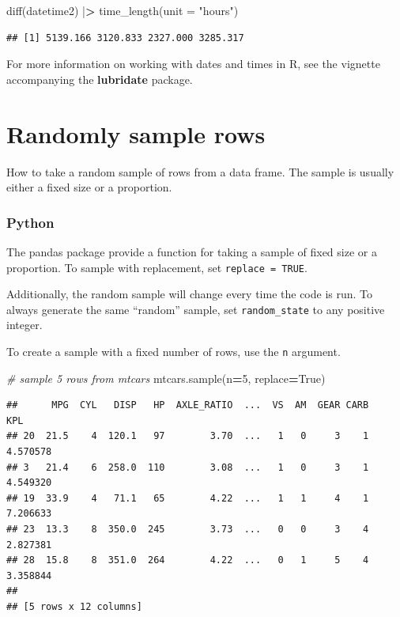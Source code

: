 \documentclass[
]{book}
\newenvironment{Shaded}{\begin{snugshade}}{\end{snugshade}}
\newcommand{\AttributeTok}[1]{\textcolor[rgb]{0.77,0.63,0.00}{#1}}
\newcommand{\CommentTok}[1]{\textcolor[rgb]{0.56,0.35,0.01}{\textit{#1}}}
\newcommand{\DecValTok}[1]{\textcolor[rgb]{0.00,0.00,0.81}{#1}}
\newcommand{\ErrorTok}[1]{\textcolor[rgb]{0.64,0.00,0.00}{\textbf{#1}}}
\newcommand{\FunctionTok}[1]{\textcolor[rgb]{0.00,0.00,0.00}{#1}}
\newcommand{\NormalTok}[1]{#1}
\newcommand{\OperatorTok}[1]{\textcolor[rgb]{0.81,0.36,0.00}{\textbf{#1}}}
\newcommand{\SpecialCharTok}[1]{\textcolor[rgb]{0.00,0.00,0.00}{#1}}
\newcommand{\StringTok}[1]{\textcolor[rgb]{0.31,0.60,0.02}{#1}}
\newcommand{\VariableTok}[1]{\textcolor[rgb]{0.00,0.00,0.00}{#1}}
\begin{document}
\begin{Shaded}
\begin{Highlighting}[]
\FunctionTok{diff}\NormalTok{(datetime2) }\SpecialCharTok{|}\ErrorTok{\textgreater{}} \FunctionTok{time\_length}\NormalTok{(}\AttributeTok{unit =} \StringTok{"hours"}\NormalTok{)}
\end{Highlighting}
\end{Shaded}

\begin{verbatim}
## [1] 5139.166 3120.833 2327.000 3285.317
\end{verbatim}

For more information on working with dates and times in R, see the vignette accompanying the \textbf{lubridate} package.

\hypertarget{randomly-sample-rows}{%
\section{Randomly sample rows}\label{randomly-sample-rows}}

How to take a random sample of rows from a data frame. The sample is usually either a fixed size or a proportion.

\hypertarget{python-29}{%
\subsubsection*{Python}\label{python-29}}

The pandas package provide a function for taking a sample of fixed size or a proportion. To sample with replacement, set \texttt{replace\ =\ TRUE}.

Additionally, the random sample will change every time the code is run. To always generate the same ``random'' sample, set \texttt{random\_state} to any positive integer.

To create a sample with a fixed number of rows, use the \texttt{n} argument.

\begin{Shaded}
\begin{Highlighting}[]
\CommentTok{\# sample 5 rows from mtcars}
\NormalTok{mtcars.sample(n}\OperatorTok{=}\DecValTok{5}\NormalTok{, replace}\OperatorTok{=}\VariableTok{True}\NormalTok{)}
\end{Highlighting}
\end{Shaded}

\begin{verbatim}
##      MPG  CYL   DISP   HP  AXLE_RATIO  ...  VS  AM  GEAR CARB       KPL
## 20  21.5    4  120.1   97        3.70  ...   1   0     3    1  4.570578
## 3   21.4    6  258.0  110        3.08  ...   1   0     3    1  4.549320
## 19  33.9    4   71.1   65        4.22  ...   1   1     4    1  7.206633
## 23  13.3    8  350.0  245        3.73  ...   0   0     3    4  2.827381
## 28  15.8    8  351.0  264        4.22  ...   0   1     5    4  3.358844
## 
## [5 rows x 12 columns]
\end{verbatim}
\end{document}
